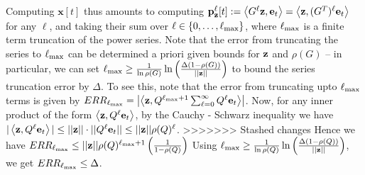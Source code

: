 Computing $\mathbf{x}[t]$ thus amounts to computing ${\mathbf{p}}_\mathbf{z}^{\ell}[t] := \left< G^{\ell}\mathbf{z}, \mathbf{e}_t \right> = \left< \mathbf{z}, (G^T)^{\ell}\mathbf{e}_t \right>$ for any $\ell$, and taking their sum over $\ell \in \{0,\ldots,\ell_{\max}\}$, where $\ell_{\max}$ is a finite term truncation of the power series.
Note that the error from truncating the series to $\ell_{\max}$ can be determined a priori given bounds for $\mathbf{z}$ and $\rho(G)$ -- in particular, we can set $\ell_{\max} \geq \frac{1}{\ln \rho(G)} \ln \left(\frac{\Delta(1 - \rho(G))}{||\mathbf{z}||} \right)$  to bound the series truncation error by $\Delta$. 
To see this, note that the error from truncating upto $\ell_{\max}$ terms is given by $ERR_{\ell_{\max}} = \left| \left< \mathbf{z},  Q^{\ell_{\max} + 1} \sum_{\ell= 0}^\infty Q^\ell\mathbf{e}_t \right> \right|$. Now, for any inner product of the form $\left< \mathbf{z}, Q^\ell \mathbf{e}_t \right>$, by the Cauchy - Schwarz inequality we have $|\left< \mathbf{z}, Q^\ell \mathbf{e}_t \right>| \leq ||\mathbf{z}|| \cdot ||{Q}^\ell \mathbf{e}_t|| \leq ||\mathbf{z}|| \rho(Q)^{\ell}$.
>>>>>>> Stashed changes
Hence we have
$ERR_{\lm} \leq %
 ||\bz|| \rho(Q)^{\lm+1}\left(\frac{1}{1 - \rho(Q)} \right)$
Using $\ell_{\max} \geq \frac{1}{\ln \rho(Q)}  \ln \left(\frac{\Delta(1 - \rho(Q)) }{||\mathbf{z}||}\right)$, we get $ERR_{\ell_{\max}} \leq \Delta$.

